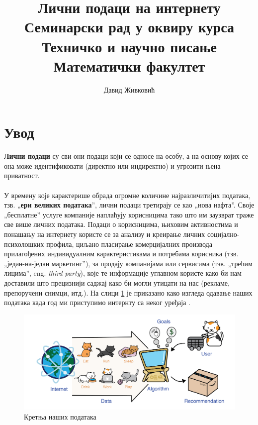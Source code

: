 \documentclass[a4paper]{article}
\title{Лични подаци на интернету\\ \small Семинарски рад у оквиру курса\\Техничко и научно писање\\ Математички факултет}
\author{Давид Живковић}
\begin{document}
\maketitle
\date

\tableofcontents

\newpage

\section{Увод}
\label{sec:увод}
\textbf{Лични подаци} су сви они подаци који се односе на особу, а на основу којих се она може идентификовати (директно или индиректно) и угрозити њена приватност.
\paragraph{}
У времену које карактерише обрада огромне количине најразличитијих података, тзв. „\textbf{ери великих података}”, лични подаци третирају се као „нова нафта”. Своје „бесплатне” услуге компаније наплаћују корисницима тако што им заузврат траже све више личних података. Подаци о корисницима\sloppy, њиховим активностима и понашању на интернету користе се за анализу и креирање личних социјално-психолошких профила, циљано пласирање комерцијалних производа прилагођених индивидуалним карактеристикама и потребама корисника (тзв. „један-на-један маркетинг”), за продају компанијама или сервисима (тзв. „трећим лицима”, eng. \emph {third party}), које те информације углавном користе како би нам доставили што прецизнији саджај како би могли утицати на нас (рекламе, препоручени снимци, итд.). На слици \ref {fig:k} је приказано како изгледа одавање наших података када год ми приступимо интернту са неког уређаја .

\begin{figure}[h!]
\begin{center}
\includegraphics[scale=0.1]{slika2.jpg}
\end{center}
\caption{Кретња наших података}
\label{fig:k}
\end{figure}
\end{document}
